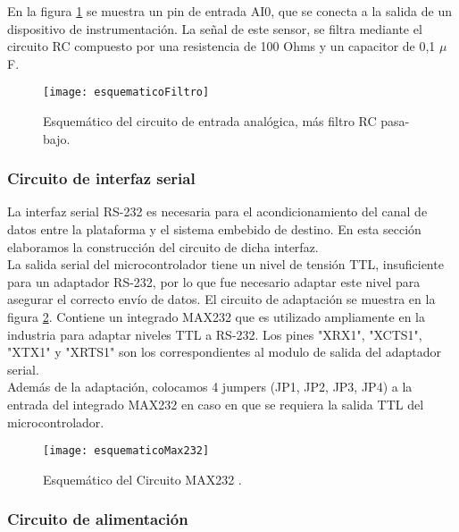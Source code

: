 En la figura \ref{fig:esquematicoFiltro} se muestra un pin de entrada AI0, que se conecta a la salida de un dispositivo de instrumentación. La señal de este sensor, se filtra mediante el circuito RC compuesto por una resistencia de 100 Ohms y un capacitor de 0,1 $\mu$F.

\begin{figure}[H]
  \centering
  \texttt{[image: esquematicoFiltro]}
  \caption{Esquemático del circuito de entrada analógica, más filtro RC pasa-bajo.}\label{fig:esquematicoFiltro}
\end{figure}


\subsubsection{Circuito de interfaz serial}
\label{it3:ssub:circuito_de_interfaz_serial}

La interfaz serial RS-232 es necesaria para el acondicionamiento del canal de datos entre la plataforma y el sistema embebido de destino. En esta sección elaboramos la construcción del circuito de dicha interfaz. \\

La salida serial del microcontrolador tiene un nivel de tensión TTL, insuficiente para un adaptador RS-232, por lo que fue necesario adaptar este nivel para asegurar el correcto envío de datos. El circuito de adaptación se muestra en la figura \ref{fig:esquematicoMax232}. Contiene un integrado MAX232 que es utilizado ampliamente en la industria para adaptar niveles TTL a RS-232. Los pines "XRX1", "XCTS1", "XTX1" y "XRTS1" son los correspondientes al modulo de salida del adaptador serial. \\

Además de la adaptación, colocamos 4 jumpers (JP1, JP2, JP3, JP4) a la entrada del integrado MAX232 en caso en que se requiera la salida TTL del microcontrolador. \\

\begin{figure}[H]
  \centering
  \texttt{[image: esquematicoMax232]}
  \caption{Esquemático del Circuito MAX232 .}\label{fig:esquematicoMax232}
\end{figure}


\subsubsection{Circuito de alimentación}
\label{it3:ssub:circuito_de_alimentacion}

